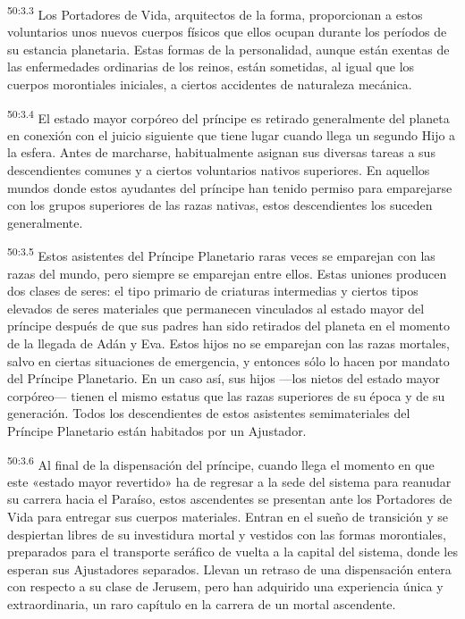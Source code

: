 \par
\textsuperscript{50:3.3} Los Portadores de Vida, arquitectos de la forma, proporcionan a estos voluntarios unos nuevos cuerpos físicos que ellos ocupan durante los períodos de su estancia planetaria. Estas formas de la personalidad, aunque están exentas de las enfermedades ordinarias de los reinos, están sometidas, al igual que los cuerpos morontiales iniciales, a ciertos accidentes de naturaleza mecánica.

\par
\textsuperscript{50:3.4} El estado mayor corpóreo del príncipe es retirado generalmente del planeta en conexión con el juicio siguiente que tiene lugar cuando llega un segundo Hijo a la esfera. Antes de marcharse, habitualmente asignan sus diversas tareas a sus descendientes comunes y a ciertos voluntarios nativos superiores. En aquellos mundos donde estos ayudantes del príncipe han tenido permiso para emparejarse con los grupos superiores de las razas nativas, estos descendientes los suceden generalmente.

\par
\textsuperscript{50:3.5} Estos asistentes del Príncipe Planetario raras veces se emparejan con las razas del mundo, pero siempre se emparejan entre ellos. Estas uniones producen dos clases de seres: el tipo primario de criaturas intermedias y ciertos tipos elevados de seres materiales que permanecen vinculados al estado mayor del príncipe después de que sus padres han sido retirados del planeta en el momento de la llegada de Adán y Eva. Estos hijos no se emparejan con las razas mortales, salvo en ciertas situaciones de emergencia, y entonces sólo lo hacen por mandato del Príncipe Planetario. En un caso así, sus hijos ---los nietos del estado mayor corpóreo--- tienen el mismo estatus que las razas superiores de su época y de su generación. Todos los descendientes de estos asistentes semimateriales del Príncipe Planetario están habitados por un Ajustador.

\par
\textsuperscript{50:3.6} Al final de la dispensación del príncipe, cuando llega el momento en que este «estado mayor revertido» ha de regresar a la sede del sistema para reanudar su carrera hacia el Paraíso, estos ascendentes se presentan ante los Portadores de Vida para entregar sus cuerpos materiales. Entran en el sueño de transición y se despiertan libres de su investidura mortal y vestidos con las formas morontiales, preparados para el transporte seráfico de vuelta a la capital del sistema, donde les esperan sus Ajustadores separados. Llevan un retraso de una dispensación entera con respecto a su clase de Jerusem, pero han adquirido una experiencia única y extraordinaria, un raro capítulo en la carrera de un mortal ascendente.

